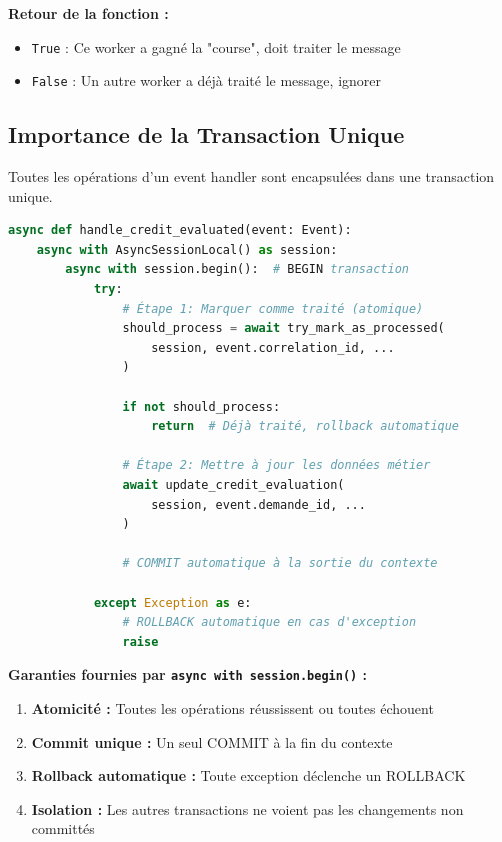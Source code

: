 \documentclass[12pt,a4paper]{article}
\begin{document}
\textbf{Retour de la fonction :}
\begin{itemize}
    \item \texttt{True} : Ce worker a gagné la "course", doit traiter le message
    \item \texttt{False} : Un autre worker a déjà traité le message, ignorer
\end{itemize}

\subsection{Importance de la Transaction Unique}

Toutes les opérations d'un event handler sont encapsulées dans une transaction unique.

\begin{lstlisting}[language=Python]
async def handle_credit_evaluated(event: Event):
    async with AsyncSessionLocal() as session:
        async with session.begin():  # BEGIN transaction
            try:
                # Étape 1: Marquer comme traité (atomique)
                should_process = await try_mark_as_processed(
                    session, event.correlation_id, ...
                )
                
                if not should_process:
                    return  # Déjà traité, rollback automatique
                
                # Étape 2: Mettre à jour les données métier
                await update_credit_evaluation(
                    session, event.demande_id, ...
                )
                
                # COMMIT automatique à la sortie du contexte
                
            except Exception as e:
                # ROLLBACK automatique en cas d'exception
                raise
\end{lstlisting}

\textbf{Garanties fournies par \texttt{async with session.begin()} :}

\begin{enumerate}
    \item \textbf{Atomicité :} Toutes les opérations réussissent ou toutes échouent
    \item \textbf{Commit unique :} Un seul COMMIT à la fin du contexte
    \item \textbf{Rollback automatique :} Toute exception déclenche un ROLLBACK
    \item \textbf{Isolation :} Les autres transactions ne voient pas les changements non committés
\end{enumerate}
\end{document}

